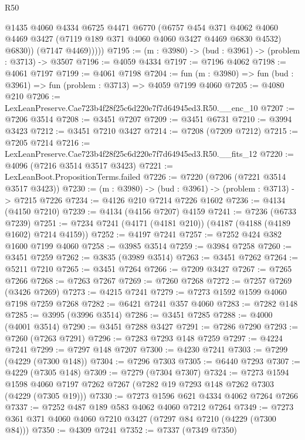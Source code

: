 \begin{lexlean}{R50}
\begin{coremodule}
              @1435
              @4060
              @4334
              @6725
              @4471
              @6770
              (@6757
                @454
                @371
                @4062
                @4060
                @4469
                @3427
                (@7119 @189 @371 @4060 @4060 @3427 @4469 @6830 @4532)
                @6830))
            (@7147 @4469)))))
@7195 := (m : @3980) -> (bud : @3961) -> (problem : @3713) -> @3507
@7196 := @4059 @4334
@7197 := @7196 @4062
@7198 := @4061 @7197
@7199 := @4061 @7198
@7204 := fun (m : @3980) => fun (bud : @3961) => fun (problem : @3713) => @4059 @7199 @4060
@7205 := @4080 @210
@7206 := LexLeanPreserve.Cae723b4f28f25c6d220e7f7d64945ed3.R50.__enc_10
@7207 := @7206 @3514
@7208 := @3451 @7207
@7209 := @3451 @6731
@7210 := @3994 @3423
@7212 := @3451 @7210 @3427
@7214 := @7208 (@7209 @7212)
@7215 := @7205 @7214
@7216 := LexLeanPreserve.Cae723b4f28f25c6d220e7f7d64945ed3.R50.__fits_12
@7220 := @4096 (@7216 @3514 @3517 @3423)
@7221 := LexLeanBoot.PropositionTerms.failed
@7226 := @7220 (@7206 (@7221 @3514 @3517 @3423))
@7230 := (m : @3980) -> (bud : @3961) -> (problem : @3713) -> @7215 @7226
@7234 := @4126 @210 @7214 @7226 @1602
@7236 := @4134 (@4150 @7210)
@7239 := @4134 (@4156 @7207) @4159
@7241 := @7236 (@6733 @7239)
@7251 := @7234 @7241 (@4171 (@4181 @210)) (@4187 (@4188 (@4189 @1602) @7214 @4159))
@7252 := @4197 @7241
@7257 := @7252 @424 @382 @1600 @7199 @4060
@7258 := @3985 @3514
@7259 := @3984 @7258
@7260 := @3451 @7259
@7262 := @3835 (@3989 @3514)
@7263 := @3451 @7262
@7264 := @5211 @7210
@7265 := @3451 @7264
@7266 := @7209 @3427
@7267 := @7265 @7266
@7268 := @7263 @7267
@7269 := @7260 @7268
@7272 := @7257 @7269 (@3426 @7269)
@7273 := @4215 @7241
@7279 := @7273 @1592 @1599 @4060 @7198 @7259 @7268
@7282 := @6421 @7241 @357 @4060
@7283 := @7282 @148
@7285 := @3995 (@3996 @3514)
@7286 := @3451 @7285
@7288 := @4000 (@4001 @3514)
@7290 := @3451 @7288 @3427
@7291 := @7286 @7290
@7293 := @7260 (@7263 @7291)
@7296 := @7283 @7293 @148 @7259
@7297 := @4224 @7241
@7299 := @7297 @148 @7207
@7300 := @4230 @7241
@7303 := @7299 (@4229 (@7300 @148))
@7304 := @7296 @7303
@7305 := @6440 @7293
@7307 := @4229 (@7305 @148)
@7309 := @7279 (@7304 @7307)
@7324 := @7273
    @1594
    @1598
    @4060
    @7197
    @7262
    @7267
    (@7282 @19 @7293 @148 @7262 @7303 (@4229 (@7305 @19)))
@7330 := @7273 @1596 @621 @4334 @4062 @7264 @7266
@7337 := @7252 @487 @189 @583 @4062 @4060 @7212 @7264
@7349 := @7273 @361 @371 @4060 @4060 @7210 @3427 (@7297 @84 @7210 (@4229 (@7300 @84)))
@7350 := @4309 @7241
@7352 := @7337 (@7349 @7350)

\end{coremodule}
\end{lexlean}
